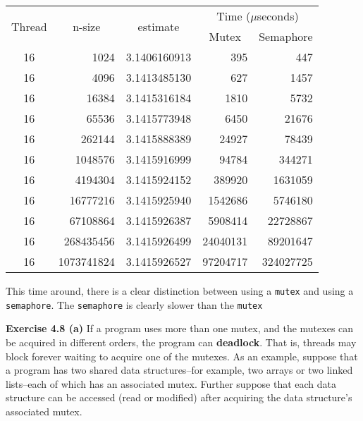 \documentclass[12pt]{article}
\begin{document}
\begin{center}
    \begin{tabular}{| c | r | c | r | r |}
        \hline
        \multirow{2}{*}{Thread} & \multicolumn{1}{|c|}{\multirow{2}{*}{n-size}} & \multirow{2}{*}{estimate} & \multicolumn{2}{|c|}{Time ($\mu$seconds)}\\ \cline{4-5}
         & & & \multicolumn{1}{|c}{Mutex} & \multicolumn{1}{|c|}{Semaphore}\\ \hline
        16 &       1024 & 3.1406160913 &      395 &       447\\
        16 &       4096 & 3.1413485130 &      627 &      1457\\
        16 &      16384 & 3.1415316184 &     1810 &      5732\\
        16 &      65536 & 3.1415773948 &     6450 &     21676\\
        16 &     262144 & 3.1415888389 &    24927 &     78439\\
        16 &    1048576 & 3.1415916999 &    94784 &    344271\\
        16 &    4194304 & 3.1415924152 &   389920 &   1631059\\
        16 &   16777216 & 3.1415925940 &  1542686 &   5746180\\
        16 &   67108864 & 3.1415926387 &  5908414 &  22728867\\
        16 &  268435456 & 3.1415926499 & 24040131 &  89201647\\
        16 & 1073741824 & 3.1415926527 & 97204717 & 324027725\\
        \hline
    \end{tabular}
\end{center}

This time around, there is a clear distinction between using a \texttt{mutex} and using a \texttt{semaphore}. The \texttt{semaphore} is clearly slower than the \texttt{mutex}

\pagebreak

\textbf{Exercise 4.8 (a)} If a program uses more than one mutex, and the mutexes can be acquired in different orders, the program can \textbf{deadlock}. That is, threads may block forever waiting to acquire one of the mutexes. As an example, suppose that a program has two shared data structures--for example, two arrays or two linked lists--each of which has an associated mutex. Further suppose that each data structure can be accessed (read or modified) after acquiring the data structure's associated mutex.
\end{document}
